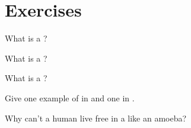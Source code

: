 \section{Exercises}

\begin{exercise}[$\star$]\label{exo:g6:uni-multi:1}
What is a ?
\end{exercise}

\begin{exercise}[$\star$]\label{exo:g6:uni-multi:2}
What is a ?
\end{exercise}

\begin{exercise}[$\star$]\label{exo:g6:uni-multi:3}
What is a ?
\end{exercise}

\begin{exercise}[$\star$]\label{exo:g6:uni-multi:4}
Give one example of  in  and one in .
\end{exercise}

\begin{exercise}[$\star\star$]\label{exo:g6:uni-multi:5}
Why can't a human   live free in a  like an amoeba?
\end{exercise}

